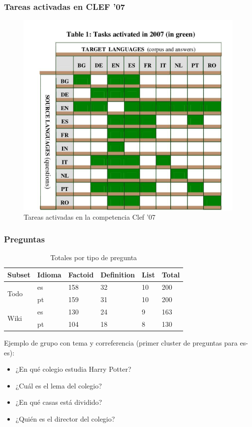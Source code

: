 \begin{frame}
  \frametitle{Tareas activadas en CLEF '07}
  \begin{figure}
      \includegraphics[scale=0.4]{graficos/clef07}
    \caption{Tareas activadas en la competencia Clef '07}
    \label{fig:tareas}
  \end{figure}
\end{frame}

\begin{frame}
\frametitle{Preguntas}
  \begin{center}
  \begin{table}
  \centering
  \begin{tabular}{| l | l | l | l | l | l |}
  \hline
  Subset & Idioma & Factoid & Definition & List & Total \\ \hline
  \multirow{2}{*}{Todo} & es & 158 & 32 & 10 & 200 \\ \cline{2-6}
   & pt & 159 & 31 & 10 & 200 \\ \hline
   \multirow{2}{*}{Wiki} & es & 130 & 24 & 9 & 163 \\ \cline{2-6}
   & pt & 104 & 18 & 8 & 130 \\ \hline
  \end{tabular}
  \caption{Totales por tipo de pregunta}
  \label{table:totals-type-question}
  \end{table}
  \end{center}

  Ejemplo de grupo con tema y correferencia (primer cluster de preguntas para es-es):
  \begin{itemize}
  \item ¿En qué colegio estudia Harry Potter?
  \item ¿Cuál es el lema del colegio?
  \item ¿En qué casas está dividido?
  \item ¿Quién es el director del colegio?
  \end{itemize}

\end{frame}


